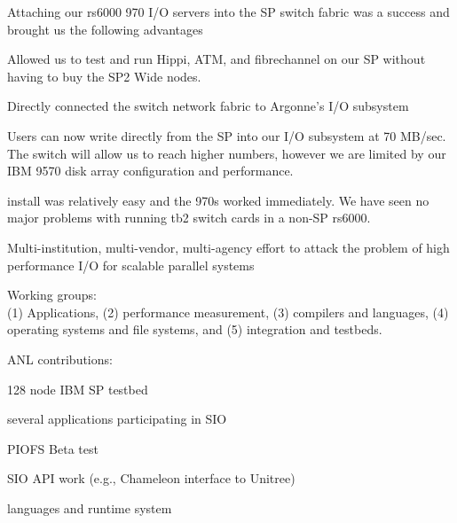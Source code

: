 
\begin{small}
Attaching our rs6000 970 I/O servers into the SP switch fabric was a success
and brought us the following advantages

\begin{mainpts}
\item  Allowed us to test and run Hippi, ATM, and fibrechannel on our SP
   without having to buy the SP2 Wide nodes.

\item  Directly connected the switch network fabric to Argonne's I/O subsystem 

\item  Users can now write directly from the SP into our I/O subsystem
   at 70 MB/sec.  The switch will allow us to reach higher numbers,
   however we are limited by our IBM 9570 disk array configuration and
   performance.  


\item  install was relatively easy and the 970s worked immediately.  We 
   have seen no major problems with running tb2 switch cards in 
   a non-SP rs6000.
\end{mainpts}
\end{small}
\ve

\begin{small}
Multi-institution, multi-vendor, multi-agency
effort to attack the problem of high performance I/O for scalable parallel
systems

Working groups:\\
(1) Applications, (2) performance measurement, (3) compilers and languages, 
(4) operating
systems and file systems, and (5) integration and testbeds.

ANL contributions:
\begin{mainpts}
\item 128 node IBM SP testbed
\item several applications participating in SIO
\item PIOFS Beta test
\item SIO API work (e.g., Chameleon interface to Unitree)
\item languages and runtime system 
\end{mainpts}

\end{small}
\ve


